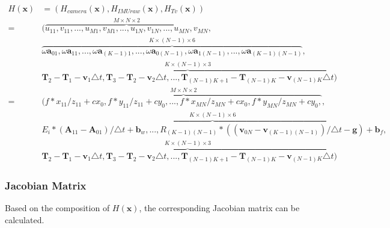 \documentclass[12pt]{article}   %
\begin{document}
\begin{align} %
H(\textbf{x}) &= (H_{camera}(\textbf{x}), H_{IMUraw}(\textbf{x}), H_{Tv}(\textbf{x})) \nonumber \\
	=& (\overbrace{{u}_{11}, {v}_{11}, ... , {u}_{M1}, {v}_{M1}, ..., {u}_{1N}, {v}_{1N}, ... , {u}_{MN}, {v}_{MN}}^{M \times N \times 2}, \nonumber \\ 
	& \overbrace{\omega\textbf{a}_{01}, \omega\textbf{a}_{11}, ... , \omega\textbf{a}_{(K-1)1}, ..., \omega\textbf{a}_{0(N-1)}, \omega\textbf{a}_{1(N-1)}, ... , \omega\textbf{a}_{(K-1)(N-1)}}^{K \times (N-1) \times 6}, \nonumber \\
	& \overbrace{\textbf{T}_2 - \textbf{T}_{1} - \textbf{v}_{1} \triangle t, \textbf{T}_{3} - \textbf{T}_{2} - \textbf{v}_{2} \triangle t, ... , \textbf{T}_{(N-1)K+1} - \textbf{T}_{(N-1)K} - \textbf{v}_{(N-1)K} \triangle t}^{K \times (N-1) \times 3}) \nonumber \\
	=& (\overbrace{f * x_{11} / z_{11} + cx_0, f * y_{11} / z_{11} + cy_0, ... , f * x_{MN} / z_{MN} + cx_0, f * y_{MN} / z_{MN} + cy_0, }^{M \times N \times 2}, \nonumber \\ 
	& \overbrace{E_i*(\textbf{A}_{11} - \textbf{A}_{01})/\triangle t + \textbf{b}_w, ..., R_{(K-1)(N-1)} * ((\textbf{v}_{0N} - \textbf{v}_{(K-1)(N-1)}) / \triangle t - \textbf{g}) + \textbf{b}_f}^{K \times (N-1) \times 6}, \nonumber \\
	& \overbrace{\textbf{T}_2 - \textbf{T}_{1} - \textbf{v}_{1} \triangle t, \textbf{T}_{3} - \textbf{T}_{2} - \textbf{v}_{2} \triangle t, ... , \textbf{T}_{(N-1)K+1} - \textbf{T}_{(N-1)K} - \textbf{v}_{(N-1)K} \triangle t}^{K \times (N-1) \times 3}) 
\end{align}


\subsubsection{Jacobian Matrix}

Based on the composition of $H(\textbf{x})$, the corresponding Jacobian matrix can be calculated. 
\end{document}
